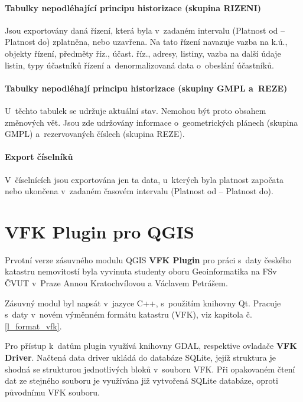 \documentclass[a4paper,12pt,oneside]{book}
\begin{document}
\subsubsection{Tabulky nepodléhající principu historizace (skupina RIZENI)}

Jsou exportovány daná řízení, která byla v~zadaném intervalu (Platnost od -- Platnost do) zplatněna, nebo uzavřena. Na tato řízení navazuje vazba na k.ú., objekty řízení, předměty říz., účast. říz., adresy, listiny, vazba na další údaje listin, typy účastníků řízení a~denormalizovaná data o~obeslání účastníků. \cite{vfk_struktura}

\subsubsection{Tabulky nepodléhají principu historizace (skupiny GMPL a~REZE)}

U~těchto tabulek se udržuje aktuální stav. Nemohou být proto obsahem změnových vět. Jsou zde udržovány informace o~geometrických plánech (skupina GMPL) a~rezervovaných číslech (skupina REZE). \cite{vfk_struktura}

\subsubsection{Export číselníků}

V~číselnících jsou exportována jen ta data, u~kterých byla platnost započata nebo ukončena v~zadaném časovém intervalu (Platnost od -- Platnost do). \cite{vfk_struktura}


\clearpage
\chapter{VFK Plugin pro QGIS}
Prvotní verze zásuvného modulu QGIS \textbf{VFK Plugin} pro práci s~daty českého katastru nemovitostí byla vyvinuta studenty oboru Geoinformatika na FSv ČVUT v~Praze Annou Kratochvílovou a Václavem Petrášem. 

Zásuvný modul byl napsát v~jazyce C++, s~použitím knihovny Qt. Pracuje s~daty v~novém výměnném formátu katastru (VFK), viz kapitola č. \ref{l_format_vfk}. 

Pro přístup k~datům plugin využívá knihovny GDAL, respektive ovladače \textbf{VFK Driver}. Načtená data driver ukládá do databáze SQLite, jejíž struktura je shodná se strukturou jednotlivých bloků v~souboru VFK. Při opakovaném čtení dat ze stejného souboru je využívána již vytvořená SQLite databáze, oproti původnímu VFK souboru. 
\end{document}
